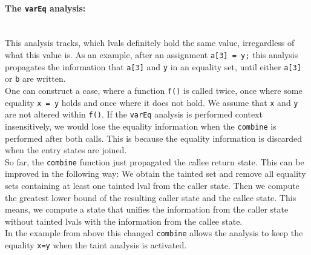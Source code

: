       \paragraph{The \texttt{varEq} analysis:}\mbox{}\\
        This analysis tracks, which \ac{lval}s definitely hold the same value, irregardless of what this value is. As an example, after an assignment \texttt{a[3] = y;} this analysis propagates the information that \texttt{a[3]} and \texttt{y} in an equality set, until either \texttt{a[3]} or \texttt{b} are written.\\
        One can construct a case, where a function \texttt{f()} is called twice, once where some equality \texttt{x = y} holds and once where it does not hold. We assume that \texttt{x} and \texttt{y} are not altered within \texttt{f()}. If the \texttt{varEq} analysis is performed context insensitively, we would lose the equality information when the \texttt{combine} is performed after both calls. This is because the equality information is discarded when the entry states are joined.\\
        So far, the \texttt{combine} function just propagated the callee return state. This can be improved in the following way: We obtain the tainted set and remove all equality sets containing at least one tainted \ac{lval} from the caller state. Then we compute the greatest lower bound of the resulting caller state and the callee state. This means, we compute a state that unifies the information from the caller state without tainted \ac{lval}s with the information from the callee state.\\
        In the example from above this changed \texttt{combine} allows the analysis to keep the equality \texttt{x=y} when the taint analysis is activated.


